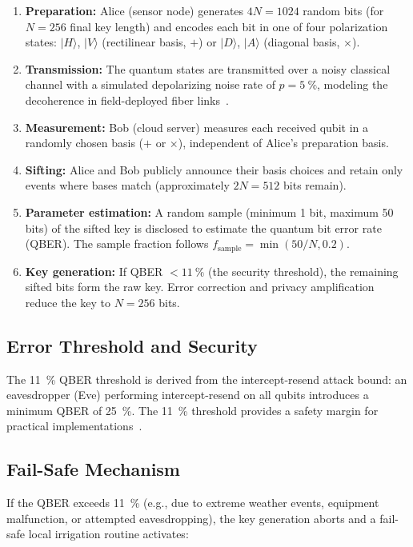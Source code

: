 \documentclass[11pt,a4paper]{article}
\begin{document}
\begin{enumerate}
\item \textbf{Preparation:} Alice (sensor node) generates $4N = 1024$ random bits (for $N = 256$ final key length) and encodes each bit in one of four polarization states: $|H\rangle$, $|V\rangle$ (rectilinear basis, $+$) or $|D\rangle$, $|A\rangle$ (diagonal basis, $\times$).
\item \textbf{Transmission:} The quantum states are transmitted over a noisy classical channel with a simulated depolarizing noise rate of $p = \SI{5}{\percent}$, modeling the decoherence in field-deployed fiber links~\cite{Zahidy2024}.
\item \textbf{Measurement:} Bob (cloud server) measures each received qubit in a randomly chosen basis ($+$ or $\times$), independent of Alice's preparation basis.
\item \textbf{Sifting:} Alice and Bob publicly announce their basis choices and retain only events where bases match (approximately $2N = 512$ bits remain).
\item \textbf{Parameter estimation:} A random sample (minimum 1 bit, maximum 50 bits) of the sifted key is disclosed to estimate the quantum bit error rate (QBER). The sample fraction follows $f_{\mathrm{sample}} = \min(50/N, 0.2)$.
\item \textbf{Key generation:} If QBER $< \SI{11}{\percent}$ (the security threshold), the remaining sifted bits form the raw key. Error correction and privacy amplification reduce the key to $N = 256$ bits.
\end{enumerate}

\subsection{Error Threshold and Security}

The \SI{11}{\percent} QBER threshold is derived from the intercept-resend attack bound: an eavesdropper (Eve) performing intercept-resend on all qubits introduces a minimum QBER of \SI{25}{\percent}. The \SI{11}{\percent} threshold provides a safety margin for practical implementations~\cite{Bennett1984,Zahidy2024}.

\subsection{Fail-Safe Mechanism}

If the QBER exceeds \SI{11}{\percent} (e.g., due to extreme weather events, equipment malfunction, or attempted eavesdropping), the key generation aborts and a fail-safe local irrigation routine activates:
\end{document}
